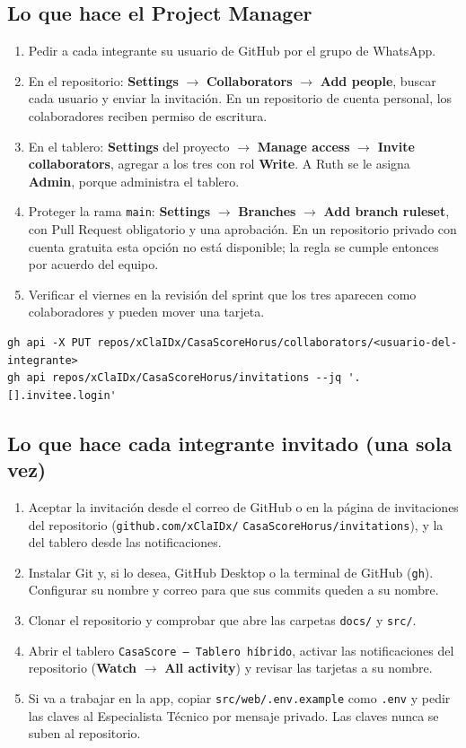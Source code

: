 \documentclass[11pt,a4paper]{article}
\begin{document}
\subsection{Lo que hace el Project Manager}
\begin{enumerate}[leftmargin=*]
    \item Pedir a cada integrante su usuario de GitHub por el grupo de WhatsApp.
    \item En el repositorio: \textbf{Settings} $\rightarrow$ \textbf{Collaborators} $\rightarrow$ \textbf{Add people}, buscar cada usuario y enviar la invitación. En un repositorio de cuenta personal, los colaboradores reciben permiso de escritura.
    \item En el tablero: \textbf{Settings} del proyecto $\rightarrow$ \textbf{Manage access} $\rightarrow$ \textbf{Invite collaborators}, agregar a los tres con rol \textbf{Write}. A Ruth se le asigna \textbf{Admin}, porque administra el tablero.
    \item Proteger la rama \texttt{main}: \textbf{Settings} $\rightarrow$ \textbf{Branches} $\rightarrow$ \textbf{Add branch ruleset}, con Pull Request obligatorio y una aprobación. En un repositorio privado con cuenta gratuita esta opción no está disponible; la regla se cumple entonces por acuerdo del equipo.
    \item Verificar el viernes en la revisión del sprint que los tres aparecen como colaboradores y pueden mover una tarjeta.
\end{enumerate}

\begin{lstlisting}
gh api -X PUT repos/xClaIDx/CasaScoreHorus/collaborators/<usuario-del-integrante>
gh api repos/xClaIDx/CasaScoreHorus/invitations --jq '.[].invitee.login'
\end{lstlisting}

\subsection{Lo que hace cada integrante invitado (una sola vez)}
\begin{enumerate}[leftmargin=*]
    \item Aceptar la invitación desde el correo de GitHub o en la página de invitaciones del repositorio (\texttt{github.com/xClaIDx/} \texttt{CasaScoreHorus/invitations}), y la del tablero desde las notificaciones.
    \item Instalar Git y, si lo desea, GitHub Desktop o la terminal de GitHub (\texttt{gh}). Configurar su nombre y correo para que sus commits queden a su nombre.
    \item Clonar el repositorio y comprobar que abre las carpetas \texttt{docs/} y \texttt{src/}.
    \item Abrir el tablero \texttt{CasaScore -- Tablero híbrido}, activar las notificaciones del repositorio (\textbf{Watch} $\rightarrow$ \textbf{All activity}) y revisar las tarjetas a su nombre.
    \item Si va a trabajar en la app, copiar \texttt{src/web/.env.example} como \texttt{.env} y pedir las claves al Especialista Técnico por mensaje privado. Las claves nunca se suben al repositorio.
\end{enumerate}
\end{document}
